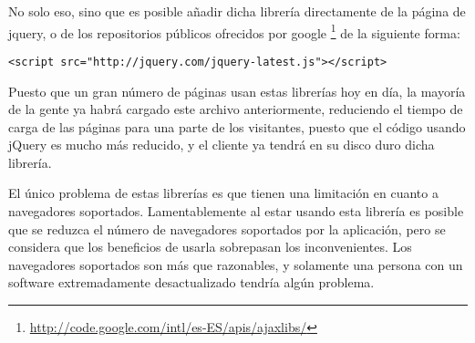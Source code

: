 No solo eso, sino que es posible añadir dicha librería directamente de la página de jquery, o de los repositorios públicos ofrecidos por google \footnote{\url{http://code.google.com/intl/es-ES/apis/ajaxlibs/}} de la siguiente forma:

\begin{verbatim}
<script src="http://jquery.com/jquery-latest.js"></script>
\end{verbatim}

Puesto que un gran número de páginas usan estas librerías hoy en día, la mayoría de la gente ya habrá cargado este archivo anteriormente, reduciendo el tiempo de carga de las páginas para una parte de los visitantes, puesto que el código usando jQuery es mucho más reducido, y el cliente ya tendrá en su disco duro dicha librería.

El único problema de estas librerías es que tienen una limitación en cuanto a navegadores soportados. Lamentablemente al estar usando esta librería es posible que se reduzca el número de navegadores soportados por la aplicación, pero se considera que los beneficios de usarla sobrepasan los inconvenientes. Los navegadores soportados son más que razonables, y solamente una persona con un software extremadamente desactualizado tendría algún problema.
